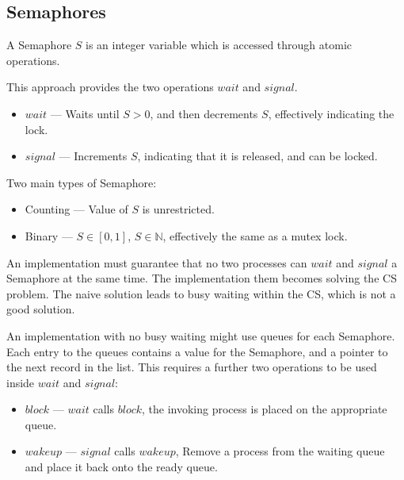 \subsection{Semaphores}

A Semaphore $S$ is an integer variable which is accessed through atomic operations.

This approach provides the two operations $wait$ and $signal$.

\begin{itemize}
    \item $wait$ --- Waits until $S>0$, and then decrements $S$, effectively indicating the lock.
    \item $signal$ --- Increments $S$, indicating that it is released, and can be locked.
\end{itemize}

Two main types of Semaphore:
\begin{itemize}
    \item Counting --- Value of $S$ is unrestricted.
    \item Binary --- $S\in[0,1]$, $S\in\mathbb{N}$, effectively the same as a mutex lock.
\end{itemize}

An implementation must guarantee that no two processes can $wait$ and $signal$ a Semaphore at the same time.
The implementation them becomes solving the CS problem. The naive solution leads to busy waiting within the CS,
which is not a good solution.

An implementation with no busy waiting might use queues for each Semaphore. Each entry to the queues contains a value for the Semaphore,
and a pointer to the next record in the list. This requires a further two operations to be used inside $wait$ and $signal$:

\begin{itemize}
    \item $block$ --- $wait$ calls $block$, the invoking process is placed on the appropriate queue.
    \item $wakeup$ --- $signal$ calls $wakeup$, Remove a process from the waiting queue and place it back onto the ready queue.
\end{itemize}